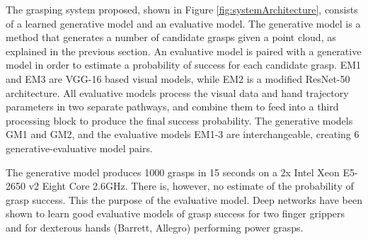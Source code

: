 The grasping system proposed, shown in Figure \ref{fig:systemArchitecture}, consists of a learned generative model and an evaluative model. The generative model is a method that generates a number of candidate grasps given a point cloud, as explained in the previous section. An evaluative model is paired with a generative model in order to estimate a probability of success for each candidate grasp. EM1 and EM3 are VGG-16 based visual models, while EM2 is a modified ResNet-50 architecture. All evaluative models process the visual data and hand trajectory parameters in two separate pathways, and combine them to feed into a third processing block to produce the final success probability. The generative models GM1 and GM2, and the evaluative models EM1-3 are interchangeable, creating 6 generative-evaluative model pairs. 

The generative model produces 1000 grasps in 15 seconds on a 2x Intel Xeon E5-2650 v2 Eight Core 2.6GHz. There is, however, no estimate of the probability of grasp success. This the purpose of the evaluative model. Deep networks have been shown to learn good evaluative models of grasp success for two finger grippers and for dexterous hands (Barrett, Allegro) performing power grasps.  




